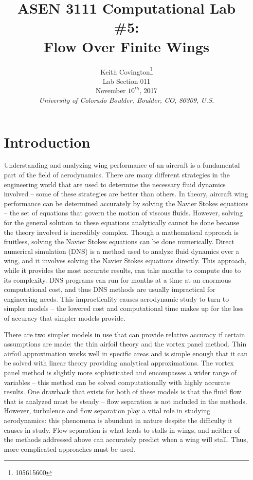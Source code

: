 \documentclass[]{aiaa-tc}%
\title{ASEN 3111 Computational Lab \#5:\\ Flow Over Finite Wings}
\author{
  Keith Covington\thanks{105615600}\\Lab Section 011\\November $10^{th}$, 2017\\
  {\normalsize\itshape
  University of Colorado Boulder, Boulder, CO, 80309, U.S.
  }
 }
\begin{document}
\maketitle

\section{Introduction}
Understanding and analyzing wing performance of an aircraft is a fundamental part of the
field of aerodynamics. There are many different strategies in the engineering world that are used
to determine the necessary fluid dynamics involved – some of these strategies are better than
others. In theory, aircraft wing performance can be determined accurately by solving the Navier
Stokes equations – the set of equations that govern the motion of viscous fluids. However,
solving for the general solution to these equations analytically cannot be done because the theory
involved is incredibly complex. Though a mathematical approach is fruitless, solving the Navier
Stokes equations can be done numerically. Direct numerical simulation (DNS) is a method used
to analyze fluid dynamics over a wing, and it involves solving the Navier Stokes equations
directly. This approach, while it provides the most accurate results, can take months to compute
due to its complexity. DNS programs can run for months at a time at an enormous computational
cost, and thus DNS methods are usually impractical for engineering needs. This impracticality
causes aerodynamic study to turn to simpler models – the lowered cost and computational time
makes up for the loss of accuracy that simpler models provide.

There are two simpler models in use that can provide relative accuracy if certain
assumptions are made: the thin airfoil theory and the vortex panel method. Thin airfoil
approximation works well in specific areas and is simple enough that it can be solved with linear
theory providing analytical approximations. The vortex panel method is slightly more
sophisticated and encompasses a wider range of variables – this method can be solved
computationally with highly accurate results. One drawback that exists for both of these models
is that the fluid flow that is analyzed must be steady – flow separation is not included in the
methods. However, turbulence and flow separation play a vital role in studying aerodynamics:
this phenomena is abundant in nature despite the difficulty it causes in study. Flow separation is
what leads to stalls in wings, and neither of the methods addressed above can accurately predict
when a wing will stall. Thus, more complicated approaches must be used.
\end{document}
